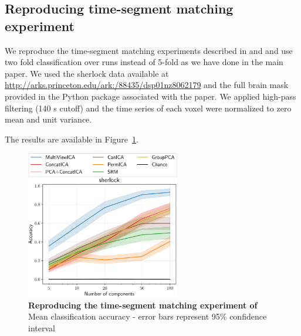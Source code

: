 \documentclass{report}
\begin{document}
\subsection{Reproducing time-segment matching experiment}
\label{appendix_reproduce}
We reproduce the time-segment matching experiments described in \cite{chen2016convolutional} and \cite{zhang2016searchlight} and use two fold classification over runs instead of 5-fold as we have done in the main paper. We used the sherlock data available at \url{http://arks.princeton.edu/ark:/88435/dsp01nz8062179} and the full brain mask provided in the Python package associated with the paper. We applied high-pass filtering (140 s cutoff) and the time series of each voxel were normalized to zero mean and unit variance.

The results are available in Figure~\ref{fig:supp_timesegment}.

\begin{figure}
  \centering
  \includegraphics[width=0.6\textwidth]{figures/mvica/timesegment_matching_cae.pdf}
  \caption{\textbf{Reproducing the time-segment matching experiment of \cite{chen2016convolutional}~\cite{zhang2016searchlight}} Mean classification accuracy - error bars represent 95\% confidence interval}
  \label{fig:supp_timesegment}
\end{figure}
\end{document}
